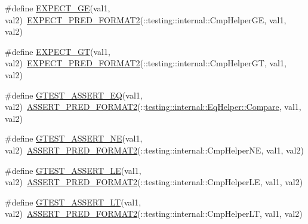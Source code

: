 \begin{DoxyCompactItemize}
\item 
\#define \mbox{\hyperlink{googletest-master_2googletest_2include_2gtest_2gtest_8h_ab7a0ff4bfa4d9b27baa118d8b0756ca0}{E\+X\+P\+E\+C\+T\+\_\+\+GE}}(val1,  val2)~\mbox{\hyperlink{_obj__test_2lib_2googletest-release-1_88_81_2googletest_2include_2gtest_2gtest__pred__impl_8h_af0141918615a5e2d5247e9cda8324dae}{E\+X\+P\+E\+C\+T\+\_\+\+P\+R\+E\+D\+\_\+\+F\+O\+R\+M\+A\+T2}}(\+::testing\+::internal\+::\+Cmp\+Helper\+GE, val1, val2)
\item 
\#define \mbox{\hyperlink{googletest-master_2googletest_2include_2gtest_2gtest_8h_aa8bc8320813e1abb0016129b636e3b27}{E\+X\+P\+E\+C\+T\+\_\+\+GT}}(val1,  val2)~\mbox{\hyperlink{_obj__test_2lib_2googletest-release-1_88_81_2googletest_2include_2gtest_2gtest__pred__impl_8h_af0141918615a5e2d5247e9cda8324dae}{E\+X\+P\+E\+C\+T\+\_\+\+P\+R\+E\+D\+\_\+\+F\+O\+R\+M\+A\+T2}}(\+::testing\+::internal\+::\+Cmp\+Helper\+GT, val1, val2)
\item 
\#define \mbox{\hyperlink{googletest-master_2googletest_2include_2gtest_2gtest_8h_a8a7a47387090810cdfe78933d348182d}{G\+T\+E\+S\+T\+\_\+\+A\+S\+S\+E\+R\+T\+\_\+\+EQ}}(val1,  val2)~\mbox{\hyperlink{_obj__test_2lib_2googletest-release-1_88_81_2googletest_2include_2gtest_2gtest__pred__impl_8h_ac452685a1a98ea3d96eb956a062ee210}{A\+S\+S\+E\+R\+T\+\_\+\+P\+R\+E\+D\+\_\+\+F\+O\+R\+M\+A\+T2}}(\+::\mbox{\hyperlink{classtesting_1_1internal_1_1_eq_helper_a14dd80457029c1ab4a4d04f20003d237}{testing\+::internal\+::\+Eq\+Helper\+::\+Compare}}, val1, val2)
\item 
\#define \mbox{\hyperlink{googletest-master_2googletest_2include_2gtest_2gtest_8h_a6fa9bb2b6731eba8f481e40e9e4931b3}{G\+T\+E\+S\+T\+\_\+\+A\+S\+S\+E\+R\+T\+\_\+\+NE}}(val1,  val2)~\mbox{\hyperlink{_obj__test_2lib_2googletest-release-1_88_81_2googletest_2include_2gtest_2gtest__pred__impl_8h_ac452685a1a98ea3d96eb956a062ee210}{A\+S\+S\+E\+R\+T\+\_\+\+P\+R\+E\+D\+\_\+\+F\+O\+R\+M\+A\+T2}}(\+::testing\+::internal\+::\+Cmp\+Helper\+NE, val1, val2)
\item 
\#define \mbox{\hyperlink{googletest-master_2googletest_2include_2gtest_2gtest_8h_abef04dcd4a0259d378de7b3b3ffb6730}{G\+T\+E\+S\+T\+\_\+\+A\+S\+S\+E\+R\+T\+\_\+\+LE}}(val1,  val2)~\mbox{\hyperlink{_obj__test_2lib_2googletest-release-1_88_81_2googletest_2include_2gtest_2gtest__pred__impl_8h_ac452685a1a98ea3d96eb956a062ee210}{A\+S\+S\+E\+R\+T\+\_\+\+P\+R\+E\+D\+\_\+\+F\+O\+R\+M\+A\+T2}}(\+::testing\+::internal\+::\+Cmp\+Helper\+LE, val1, val2)
\item 
\#define \mbox{\hyperlink{googletest-master_2googletest_2include_2gtest_2gtest_8h_a5a75667e637febd18e5f7d4f3abf55e8}{G\+T\+E\+S\+T\+\_\+\+A\+S\+S\+E\+R\+T\+\_\+\+LT}}(val1,  val2)~\mbox{\hyperlink{_obj__test_2lib_2googletest-release-1_88_81_2googletest_2include_2gtest_2gtest__pred__impl_8h_ac452685a1a98ea3d96eb956a062ee210}{A\+S\+S\+E\+R\+T\+\_\+\+P\+R\+E\+D\+\_\+\+F\+O\+R\+M\+A\+T2}}(\+::testing\+::internal\+::\+Cmp\+Helper\+LT, val1, val2)

\end{DoxyCompactItemize}
